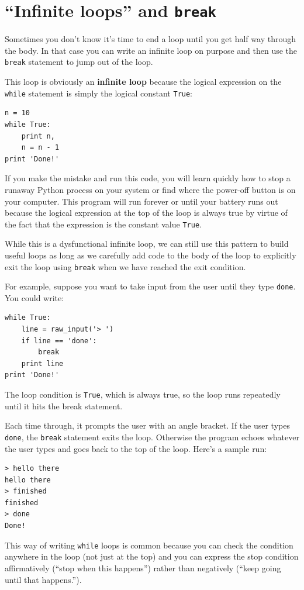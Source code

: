 \documentclass[10pt]{book}
\begin{document}
\section{``Infinite loops'' and {\tt break}}

Sometimes you don't know it's time to end a loop until you get half
way through the body.  In that case you can write an infinite loop on purpose
and then use the {\tt break} statement to jump out of the loop.

This loop is obviously an {\bf infinite loop} because the logical 
expression on the
{\tt while} statement is simply the logical constant {\tt True}:
\beforeverb
\begin{verbatim}
n = 10
while True:
    print n, 
    n = n - 1
print 'Done!'
\end{verbatim}
\afterverb
%
If you make the mistake and run this code, you will learn quickly how
to stop a runaway Python process on your system or find where the power-off
button is on your computer.  
This program will 
run forever or until your battery runs out 
because the logical expression at the top of the loop 
is always true by virtue of the fact that the expression is the 
constant value {\tt True}.

While this is a dysfunctional infinite loop, we can still use this pattern
to build useful loops as long as we carefully add code to the 
body of the loop to explicitly exit the loop using {\tt break} 
when we have reached 
the exit condition.

For example, suppose you want to take input from the user until they
type {\tt done}.  You could write:

\beforeverb
\begin{verbatim}
while True:
    line = raw_input('> ')
    if line == 'done':
        break
    print line
print 'Done!'
\end{verbatim}
\afterverb
%
The loop condition is {\tt True}, which is always true, so the
loop runs repeatedly until it hits the break statement.

Each time through, it prompts the user with an angle bracket.
If the user types {\tt done}, the {\tt break} statement exits
the loop.  Otherwise the program echoes whatever the user types
and goes back to the top of the loop.  Here's a sample run:

\beforeverb
\begin{verbatim}
> hello there
hello there
> finished
finished
> done
Done!
\end{verbatim}
\afterverb
%
This way of writing {\tt while} loops is common because you
can check the condition anywhere in the loop (not just at the
top) and you can express the stop condition affirmatively
(``stop when this happens'') rather than negatively (``keep going
until that happens.'').
\end{document}
